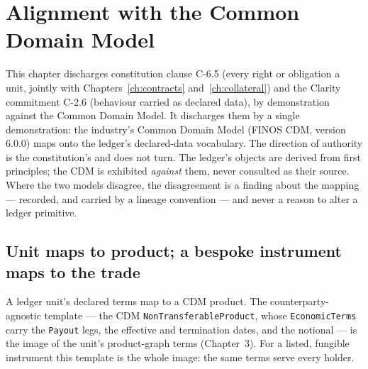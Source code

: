 \documentclass[11pt,a4paper]{article}
\begin{document}
\section{Alignment with the Common Domain Model}\label{ch:cdm}

This chapter discharges constitution clause C-6.5 (every right or obligation a unit, jointly with Chapters~\ref{ch:contracts} and~\ref{ch:collateral}) and the Clarity commitment C-2.6 (behaviour carried as declared data), by demonstration against the Common Domain Model. It discharges them by a
single demonstration: the industry's Common Domain Model (FINOS CDM, version
6.0.0) maps onto the ledger's declared-data vocabulary. The direction of
authority is the constitution's and does not turn. The ledger's objects are
derived from first principles; the CDM is exhibited \emph{against} them, never
consulted as their source. Where the two models disagree, the disagreement is a
finding about the mapping --- recorded, and carried by a lineage convention ---
and never a reason to alter a ledger primitive.

\subsection{Unit maps to product; a bespoke instrument maps to the trade}

A ledger unit's declared terms map to a CDM product. The counterparty-agnostic
template --- the CDM \texttt{NonTransferableProduct}, whose \texttt{EconomicTerms}
carry the \texttt{Payout} legs, the effective and termination dates, and the
notional --- is the image of the unit's product-graph terms (Chapter~3). For a
listed, fungible instrument this template is the whole image: the same terms
serve every holder.
\end{document}
